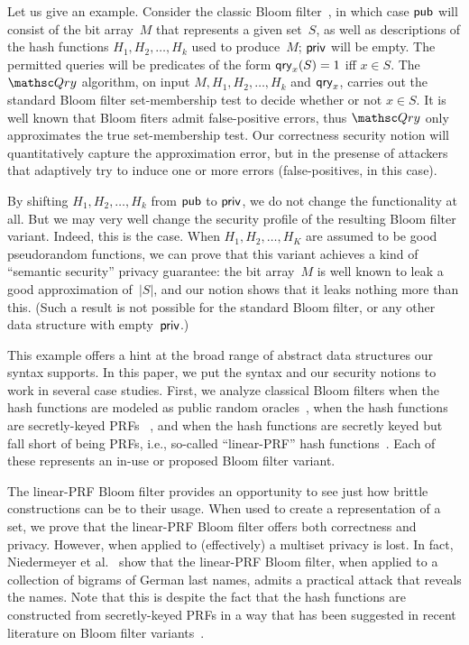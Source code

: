 Let us give an example.  Consider the classic Bloom filter~\cite{bloom1970space}, in which case ${\sf pub}$ will consist of the bit array~$M$ that represents a given set~$S$, as well as descriptions of the hash functions $H_1,H_2,\ldots,H_k$ used to produce~$M$; ${\sf priv}$ will be empty.  The permitted queries will be predicates of the form $\mathsf{qry}_x(S)=1$ iff $x \in S$. The~$\Qry$ algorithm, on input $M,H_1,H_2,\ldots,H_k$ and $\mathsf{qry}_x$, carries out the standard Bloom filter set-membership test to decide whether or not $x \in S$.  It is well known that Bloom fiters admit false-positive errors, thus $\Qry$ only approximates the true set-membership test.  Our correctness security notion will quantitatively capture the approximation error, but in the presense of attackers that adaptively try to induce one or more errors (false-positives, in this case).  

By shifting $H_1,H_2,\ldots,H_k$ from ${\sf pub}$ to ${\sf priv}$, we do not change the functionality at all.  But we may very well change the security profile of the resulting Bloom filter variant.  Indeed, this is the case.  When $H_1,H_2,\ldots,H_K$ are assumed to be good pseudorandom functions, we can prove that this variant achieves a kind of ``semantic security'' privacy guarantee: the bit array~$M$ is well known to leak a good approximation of~$|S|$, and our notion shows that it leaks nothing more than this.  (Such a result is not possible for the standard Bloom filter, or any other data structure with empty~${\sf priv}$.)

This example offers a hint at the broad range of abstract data structures our syntax supports.  In this paper, we put the syntax and our security notions to work in several case studies.  First, we analyze classical Bloom filters when the hash functions are modeled as public random oracles~\cite{broder2004network}, when the hash functions are secretly-keyed PRFs ~\cite{niedermeyer2014cryptanalysis,naor2015bloom}, and when the hash functions are secretly keyed but fall short of being PRFs, i.e., so-called ``linear-PRF'' hash functions~\cite{kirsch2006less,niedermeyer2014cryptanalysis}.  Each of these represents an in-use or proposed Bloom filter variant.  

The linear-PRF Bloom filter provides an opportunity to see just how brittle constructions can be to their usage.  When used to create a representation of a set, we prove that the linear-PRF Bloom filter offers both correctness and privacy.  However, when applied to (effectively) a multiset privacy is lost.  In fact, Niedermeyer et al.~\cite{niedermeyer2014cryptanalysis} show that the linear-PRF Bloom filter, when applied to a collection of bigrams of German last names, admits a practical attack that reveals the names.  Note that this is despite the fact that the hash functions are constructed from secretly-keyed PRFs in a way that has been suggested in recent literature on Bloom filter variants~\cite{kirsch2006less}.  

